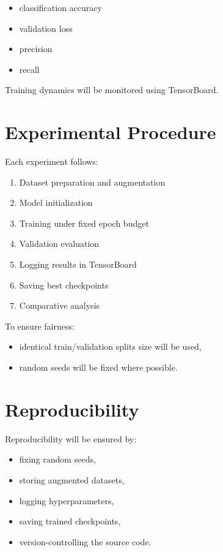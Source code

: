 \documentclass[11pt,a4paper]{article}
\begin{document}
\begin{itemize}
    \item classification accuracy
    \item validation loss
    \item precision
    \item recall
\end{itemize}

Training dynamics will be monitored using TensorBoard.

\section{Experimental Procedure}

Each experiment follows:

\begin{enumerate}
    \item Dataset preparation and augmentation
    \item Model initialization
    \item Training under fixed epoch budget
    \item Validation evaluation
    \item Logging results in TensorBoard
    \item Saving best checkpoints
    \item Comparative analysis
\end{enumerate}

To ensure fairness:

\begin{itemize}
    \item identical train/validation splits size will be used,
    \item random seeds will be fixed where possible.
\end{itemize}

\section{Reproducibility}

Reproducibility will be ensured by:

\begin{itemize}
    \item fixing random seeds,
    \item storing augmented datasets,
    \item logging hyperparameters,
    \item saving trained checkpoints,
    \item version-controlling the source code.
\end{itemize}
\end{document}
